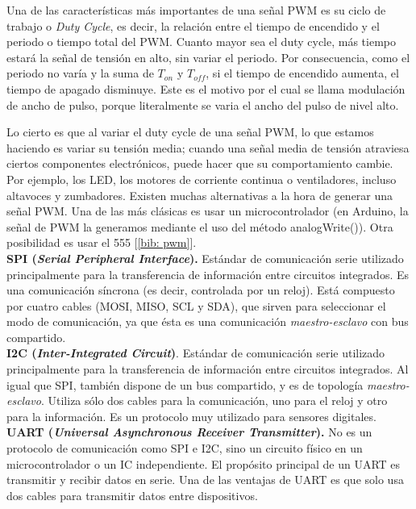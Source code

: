 \documentclass[12pt]{article}
\begin{document}
	\noindent Una de las características más importantes de una señal PWM es su ciclo de trabajo o \textit{Duty Cycle}, es decir, la relación entre el tiempo de encendido y el periodo o tiempo total del PWM. Cuanto mayor sea el duty cycle, más tiempo estará la señal de tensión en alto, sin variar el periodo. Por consecuencia, como el periodo no varía y la suma de $T_{on}$ y $T_{off}$, si el tiempo de encendido aumenta, el tiempo de apagado disminuye. Este es el motivo por el cual se llama modulación de ancho de pulso, porque literalmente se varia el ancho del pulso de nivel alto. 
	
	\noindent Lo cierto es que al variar el duty cycle de una señal PWM, lo que estamos haciendo es variar su tensión media; cuando una señal media de tensión atraviesa ciertos componentes electrónicos, puede hacer que su comportamiento cambie. Por ejemplo, los LED, los motores de corriente continua o ventiladores, incluso altavoces y zumbadores. Existen muchas alternativas a la hora de generar una señal PWM. Una de las más clásicas es usar un microcontrolador (en Arduino, la señal de PWM la generamos mediante el uso del método analogWrite()). Otra posibilidad es usar el 555 [\ref{bib: pwm}].\\
	
	\noindent \textbf{\large SPI (\textit{Serial Peripheral Interface}).} Estándar de comunicación serie utilizado principalmente para la transferencia de información entre circuitos integrados. Es una comunicación síncrona (es decir, controlada por un reloj). Está compuesto por cuatro cables (MOSI, MISO, SCL y SDA), que sirven para seleccionar el modo de comunicación, ya que ésta es una comunicación \textit{maestro-esclavo} con bus compartido.\\
	
	\noindent \textbf{\large I2C (\textit{Inter-Integrated Circuit})}. Estándar de comunicación serie utilizado principalmente para la transferencia de información entre circuitos integrados. Al igual que SPI, también dispone de un bus compartido, y es de topología \textit{maestro-esclavo}. Utiliza sólo dos cables para la comunicación, uno para el reloj y otro para la información. Es un protocolo muy utilizado para sensores digitales. \\
	
	\noindent \textbf{\large UART (\textit{Universal Asynchronous Receiver Transmitter}).} No es un protocolo de comunicación como SPI e I2C, sino un circuito físico en un microcontrolador o un IC independiente. El propósito principal de un UART es transmitir y recibir datos en serie. Una de las ventajas de UART es que solo usa dos cables para transmitir datos entre dispositivos.\\
	
\end{document}
